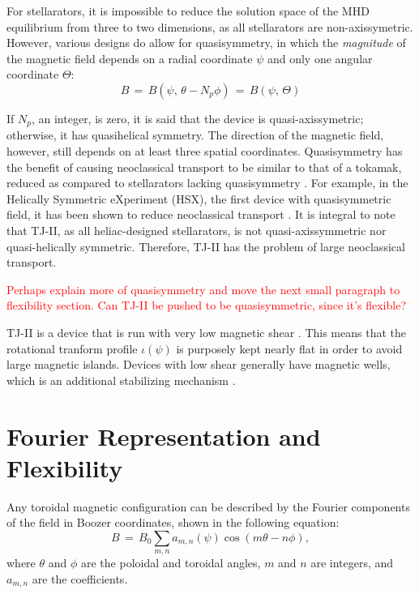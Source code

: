 \documentclass[a4paper]{article}
\newcommand\mynotes[1]{\textcolor{red}{#1}}
\begin{document}
For stellarators, it is impossible to reduce the solution space of the MHD equilibrium from three to two dimensions, as all stellarators are non-axissymetric.
However, various designs do allow for quasisymmetry, in which the \emph{magnitude} of the magnetic field depends on a radial coordinate $\psi$ and only one angular coordinate $\Theta$:
\begin{equation}
	B \,=\, B(\psi,\,\theta - N_p\phi) \,=\, B(\psi,\,\Theta)
\end{equation}

If $N_p$, an integer, is zero, it is said that the device is quasi-axissymetric; otherwise, it has quasihelical symmetry.
The direction of the magnetic field, however, still depends on at least three spatial coordinates.
Quasisymmetry has the benefit of causing neoclassical transport to be similar to that of a tokamak, reduced as compared to stellarators lacking quasisymmetry \cite{boozer_what_1998}.
For example, in the Helically Symmetric eXperiment (HSX), the first device with quasisymmetric field, it has been shown to reduce neoclassical transport \cite{talmadge_experimental_2008}.
It is integral to note that TJ-II, as all heliac-designed stellarators, is not quasi-axissymmetric nor quasi-helically symmetric.
Therefore, TJ-II has the problem of large neoclassical transport.

\mynotes{Perhaps explain more of quasisymmetry and move the next small paragraph to flexibility section. Can TJ-II be pushed to be quasisymmetric, since it's flexible?}

TJ-II is a device that is run with very low magnetic shear \cite{milligen_mhd_2012}.
This means that the rotational tranform profile $\iota(\psi)$ is purposely kept nearly flat in order to avoid large magnetic islands.
Devices with low shear generally have magnetic wells, which is an additional stabilizing mechanism \cite{aguilera_magnetic_2015}.


\section*{Fourier Representation and Flexibility}
Any toroidal magnetic configuration can be described by the Fourier components of the field in Boozer coordinates, shown in the following equation:
\begin{equation*}
	B \,=\, B_0 \sum_{m,n} a_{m,n}\left(\psi\right) \cos\left(m\theta - n\phi\right),
\end{equation*}
where $\theta$ and $\phi$ are the poloidal and toroidal angles, $m$ and $n$ are integers, and $a_{m,n}$ are the coefficients.
\end{document}
